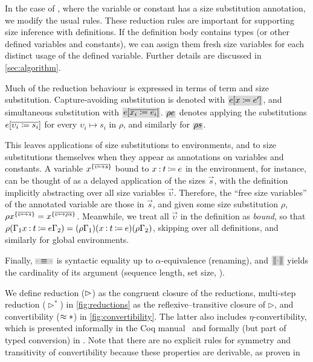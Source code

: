 

In the case of \deltaDeltareduction, where the variable or constant has a size substitution annotation, we modify the usual rules.
These reduction rules are important for supporting size inference with definitions.
If the definition body contains \coinductive types (or other defined variables and constants), we can assign them fresh size variables for each distinct usage of the defined variable.
Further details are discussed in \autoref{sec:algorithm}.

Much of the reduction behaviour is expressed in terms of term and size substitution.
Capture-avoiding substitution is denoted with $\new{\subst{e}{x}{e'}}$,
and simultaneous substitution with $\new{\substvec{e}{x_i}{e_i}}$.
$\new{\rho e}$ denotes applying the substitutions $e [\overline{\upsilon_i \coloneqq s_i}]$ for every $\upsilon_i \mapsto s_i$ in $\rho$,
and similarly for $\new{\rho s}$.

This leaves applications of size substitutions to environments,
and to size substitutions themselves when they appear as annotations on variables and constants.
A variable $x^{\{\overline{\upsilon \mapsto s}\}}$ bound to $x \mathbin{:} t \mathbin{\coloneqq} e$ in the environment, for instance,
can be thought of as a delayed application of the sizes $\vec{s}$,
with the definition implicitly abstracting over all size variables $\vec{\upsilon}$.
Therefore, the ``free size variables'' of the annotated variable are those in $\vec{s}$,
and given some size substitution $\rho$,
$\rho x^{\{\overline{\upsilon \mapsto s}\}} = x^{\{\overline{\upsilon \mapsto \rho s}\}}$.
Meanwhile, we treat all $\vec{\upsilon}$ in the definition as \emph{bound},
so that $\rho(\Gamma_1 x \mathbin{:} t \mathbin{\coloneqq} e \Gamma_2) = (\rho\Gamma_1)(x \mathbin{:} t \mathbin{\coloneqq} e)(\rho\Gamma_2)$,
skipping over all definitions, and similarly for global environments.

Finally, $\new{\ph \equiv \ph}$ is syntactic equality up to $\alpha$-equivalence (renaming),
and $\new{\norm{\ph}}$ yields the cardinality of its argument (\eg sequence length, set size, \etc).

We define reduction ($\mathrel{\rhd}$) as the congruent closure of the reductions,
multi-step reduction ($\rhd^*$) in \autoref{fig:reductions} as the reflexive--transitive closure of $\rhd$,
and convertibility ($\mathrel{\approx}*$) in \autoref{fig:convertibility}.
The latter also includes $\eta$-convertibility,
which is presented informally in the Coq manual~\citep{coq} and formally (but part of typed conversion) in \citet{conversion}.
Note that there are no explicit rules for symmetry and transitivity of convertibility
because these properties are derivable, as proven in

